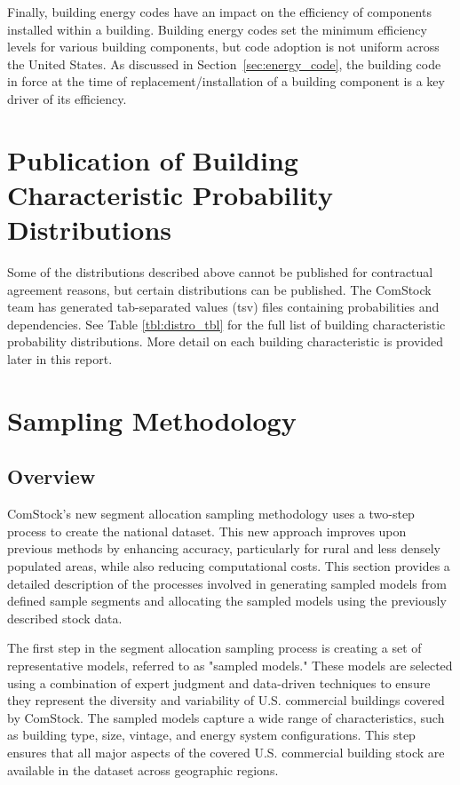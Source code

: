 Finally, building energy codes have an impact on the efficiency of components installed within a building. Building energy codes set the minimum efficiency levels for various building components, but code adoption is not uniform across the United States. As discussed in Section~\ref{sec:energy_code}, the building code in force at the time of replacement/installation of a building component is a key driver of its efficiency.

\section{Publication of Building Characteristic Probability Distributions}
Some of the distributions described above cannot be published for contractual agreement reasons, but certain distributions can be published. The ComStock team has generated tab-separated values (tsv) files containing probabilities and dependencies. See Table \ref{tbl:distro_tbl} for the full list of building characteristic probability distributions. More detail on each building characteristic is provided later in this report.



\section{Sampling Methodology}
\subsection{Overview}
ComStock's new segment allocation sampling methodology uses a two-step process to create the national dataset. This new approach improves upon previous methods by enhancing accuracy, particularly for rural and less densely populated areas, while also reducing computational costs. This section provides a detailed description of the processes involved in generating sampled models from defined sample segments and allocating the sampled models using the previously described stock data.

The first step in the segment allocation sampling process is creating a set of representative models, referred to as "sampled models." These models are selected using a combination of expert judgment and data-driven techniques to ensure they represent the diversity and variability of U.S. commercial buildings covered by ComStock. The sampled models capture a wide range of characteristics, such as building type, size, vintage, and energy system configurations. This step ensures that all major aspects of the covered U.S. commercial building stock are available in the dataset across geographic regions.

